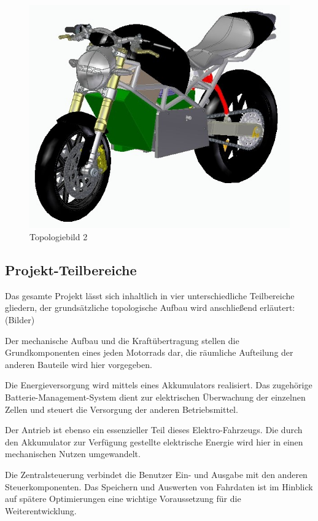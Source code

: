 \begin{figure} [H]
	\begin{center}
		\includegraphics[scale=0.9] {figures/mechanik/Ducati2.jpg}
		\caption{Topologiebild 2}
		\label{fig:Topologiebild 2}
	\end{center}
\end{figure}

\newpage

\subsection{Projekt-Teilbereiche}
Das gesamte Projekt lässt sich inhaltlich in vier unterschiedliche Teilbereiche gliedern, der grundsätzliche topologische Aufbau wird anschließend erläutert:
(Bilder)

Der mechanische Aufbau und die Kraftübertragung stellen die Grundkomponenten eines jeden Motorrads dar, die räumliche Aufteilung der anderen Bauteile wird hier vorgegeben. 

Die Energieversorgung wird mittels eines Akkumulators realisiert. Das zugehörige Batterie-Management-System dient zur elektrischen Überwachung der einzelnen Zellen und steuert die Versorgung der anderen Betriebsmittel.

Der Antrieb ist ebenso ein essenzieller Teil dieses Elektro-Fahrzeugs. Die durch den Akkumulator zur Verfügung gestellte elektrische Energie wird hier in einen mechanischen Nutzen umgewandelt.

Die Zentralsteuerung verbindet die Benutzer Ein- und Ausgabe mit den anderen Steuerkomponenten. Das Speichern und Auswerten von Fahrdaten ist im Hinblick auf spätere Optimierungen eine wichtige Voraussetzung für die Weiterentwicklung.


